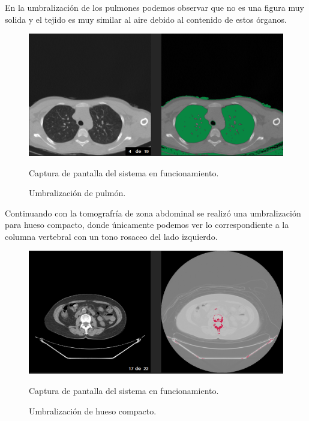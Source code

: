 \documentclass[12pt]{report}
\begin{document}
\newpage
\vspace*{3cm}
En la umbralización de los pulmones podemos observar que no es una figura muy solida y el tejido es muy similar al aire debido al contenido de estos órganos.
\begin{figure}[H]
\centering
\includegraphics[width = 15 cm, height = 8 cm]{umbralPulmon}
\caption{Umbralización de pulmón.}
Captura de pantalla del sistema en funcionamiento.
\end{figure}

\newpage
\vspace*{3cm}
Continuando con la tomografría de zona abdominal se realizó una umbralización para hueso compacto, donde únicamente podemos ver lo correspondiente a la columna vertebral con un tono rosaceo del lado izquierdo.
\begin{figure}[H]
\centering
\includegraphics[width = 15 cm, height = 8 cm]{umbralHuesoCompacto}
\caption{Umbralización de hueso compacto.}
Captura de pantalla del sistema en funcionamiento.
\end{figure}
\end{document}
